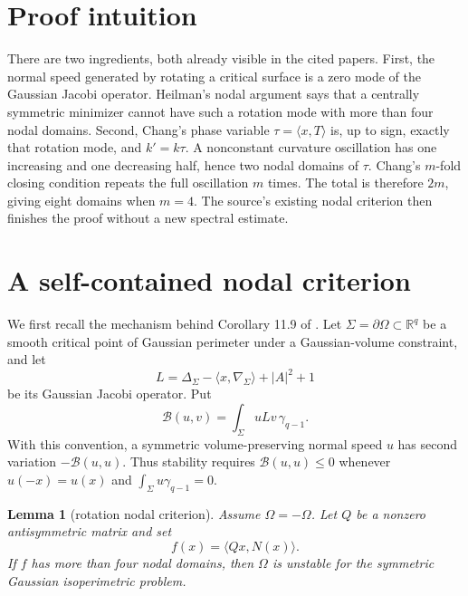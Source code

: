 \documentclass[11pt]{article}
\newtheorem{lemma}[theorem]{Lemma}
\newcommand{\R}{\mathbb R}
\newcommand{\gauss}{\gamma}
\begin{document}
\section{Proof intuition}

There are two ingredients, both already visible in the cited papers.  First,
the normal speed generated by rotating a critical surface is a zero mode of
the Gaussian Jacobi operator.  Heilman's nodal argument says that a centrally
symmetric minimizer cannot have such a rotation mode with more than four
nodal domains.  Second, Chang's phase variable
$\tau=\langle x,T\rangle$ is, up to sign, exactly that rotation mode, and
$k'=k\tau$.  A nonconstant curvature oscillation has one increasing and one
decreasing half, hence two nodal domains of $\tau$.  Chang's $m$-fold closing
condition repeats the full oscillation $m$ times.  The total is therefore
$2m$, giving eight domains when $m=4$.  The source's existing nodal criterion
then finishes the proof without a new spectral estimate.

\section{A self-contained nodal criterion}

We first recall the mechanism behind Corollary 11.9 of \cite{Heilman17}.
Let $\Sigma=\partial\Omega\subset\R^q$ be a smooth critical point of Gaussian
perimeter under a Gaussian-volume constraint, and let
\begin{equation}\label{eq:L}
 L=\Delta_\Sigma-\langle x,\nabla_\Sigma\rangle+|A|^2+1
\end{equation}
be its Gaussian Jacobi operator.  Put
\[
 \mathcal B(u,v)=\int_\Sigma uLv\,\gauss_{q-1}.
\]
With this convention, a symmetric volume-preserving normal speed $u$ has
second variation $-\mathcal B(u,u)$.  Thus stability requires
$\mathcal B(u,u)\leq0$ whenever $u(-x)=u(x)$ and
$\int_\Sigma u\gauss_{q-1}=0$.

\begin{lemma}[rotation nodal criterion]\label{lem:nodal}
Assume $\Omega=-\Omega$.  Let $Q$ be a nonzero antisymmetric matrix and set
\[
 f(x)=\langle Qx,N(x)\rangle.
\]
If $f$ has more than four nodal domains, then $\Omega$ is unstable for the
symmetric Gaussian isoperimetric problem.
\end{lemma}
\end{document}
